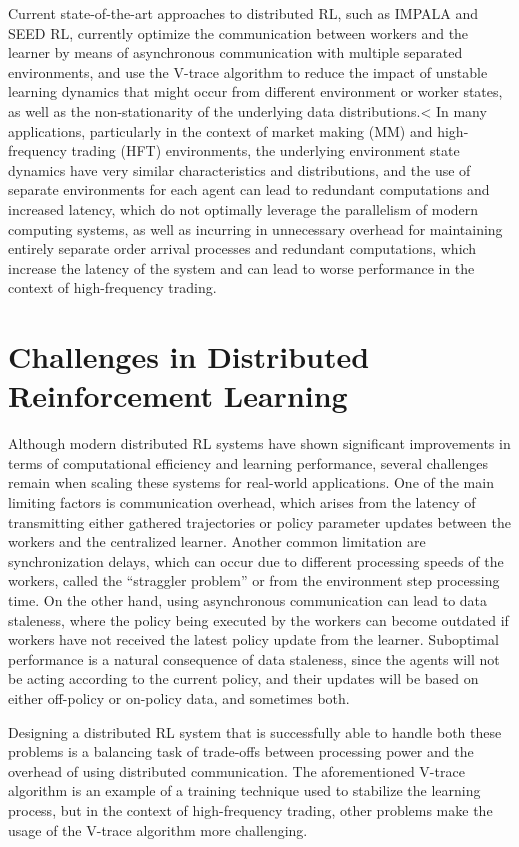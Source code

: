 Current state-of-the-art approaches to distributed RL, such as IMPALA and SEED RL, currently optimize
the communication between workers and the learner by means of asynchronous communication with multiple separated environments,
and use the V-trace algorithm to reduce the impact of unstable learning dynamics that might occur from different environment
or worker states, as well as the non-stationarity of the underlying data distributions.<
In many applications, particularly in the context of market making (MM) and high-frequency trading (HFT) environments,
the underlying environment state dynamics have very similar characteristics and distributions, and the use of separate environments
for each agent can lead to redundant computations and increased latency, which do not optimally leverage the parallelism of modern computing systems,
as well as incurring in unnecessary overhead for maintaining entirely separate order arrival processes and redundant computations,
which increase the latency of the system and can lead to worse performance in the context of high-frequency trading.

\section{Challenges in Distributed Reinforcement Learning}
\label{sec:challenges}

Although modern distributed RL systems have shown significant improvements in terms of computational efficiency and learning performance,
several challenges remain when scaling these systems for real-world applications.
One of the main limiting factors is communication overhead, which arises from the latency of transmitting either
gathered trajectories or policy parameter updates between the workers and the centralized learner.
Another common limitation are synchronization delays, which can occur due to different processing speeds
of the workers, called the ``straggler problem'' or from the environment step processing time.
On the other hand, using asynchronous communication can lead to data staleness, where the policy being executed by the workers
can become outdated if workers have not received the latest policy update from the learner.
Suboptimal performance is a natural consequence of data staleness, since the agents
will not be acting according to the current policy, and their updates will be based on either off-policy or on-policy
data, and sometimes both.

Designing a distributed RL system that is successfully able to handle both these problems is a balancing task of
trade-offs between processing power and the overhead of using distributed communication.
The aforementioned V-trace algorithm is an example of a training technique used to stabilize the learning process,
but in the context of high-frequency trading, other problems make the usage of the V-trace algorithm more challenging.

